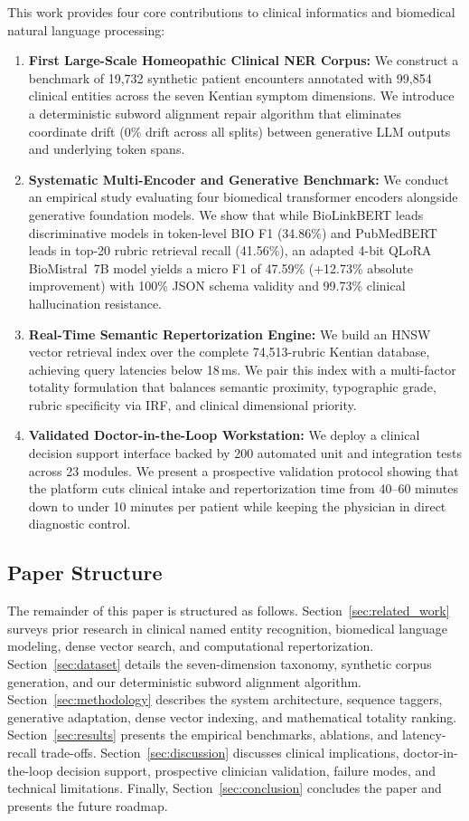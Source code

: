 This work provides four core contributions to clinical informatics and biomedical natural language processing:
\begin{enumerate}
    \item \textbf{First Large-Scale Homeopathic Clinical NER Corpus:} We construct a benchmark of 19,732 synthetic patient encounters annotated with 99,854 clinical entities across the seven Kentian symptom dimensions. We introduce a deterministic subword alignment repair algorithm that eliminates coordinate drift ($0$\% drift across all splits) between generative LLM outputs and underlying token spans.
    \item \textbf{Systematic Multi-Encoder and Generative Benchmark:} We conduct an empirical study evaluating four biomedical transformer encoders alongside generative foundation models. We show that while BioLinkBERT leads discriminative models in token-level BIO F1 (34.86\%) and PubMedBERT leads in top-20 rubric retrieval recall (41.56\%), an adapted 4-bit QLoRA BioMistral~7B model yields a micro F1 of 47.59\% (+12.73\% absolute improvement) with 100\% JSON schema validity and 99.73\% clinical hallucination resistance.
    \item \textbf{Real-Time Semantic Repertorization Engine:} We build an HNSW vector retrieval index over the complete 74,513-rubric Kentian database, achieving query latencies below 18\,ms. We pair this index with a multi-factor totality formulation that balances semantic proximity, typographic grade, rubric specificity via IRF, and clinical dimensional priority.
    \item \textbf{Validated Doctor-in-the-Loop Workstation:} We deploy a clinical decision support interface backed by 200 automated unit and integration tests across 23 modules. We present a prospective validation protocol showing that the platform cuts clinical intake and repertorization time from 40--60 minutes down to under 10 minutes per patient while keeping the physician in direct diagnostic control.
\end{enumerate}

\subsection{Paper Structure}

The remainder of this paper is structured as follows. Section~\ref{sec:related_work} surveys prior research in clinical named entity recognition, biomedical language modeling, dense vector search, and computational repertorization. Section~\ref{sec:dataset} details the seven-dimension taxonomy, synthetic corpus generation, and our deterministic subword alignment algorithm. Section~\ref{sec:methodology} describes the system architecture, sequence taggers, generative adaptation, dense vector indexing, and mathematical totality ranking. Section~\ref{sec:results} presents the empirical benchmarks, ablations, and latency-recall trade-offs. Section~\ref{sec:discussion} discusses clinical implications, doctor-in-the-loop decision support, prospective clinician validation, failure modes, and technical limitations. Finally, Section~\ref{sec:conclusion} concludes the paper and presents the future roadmap.
